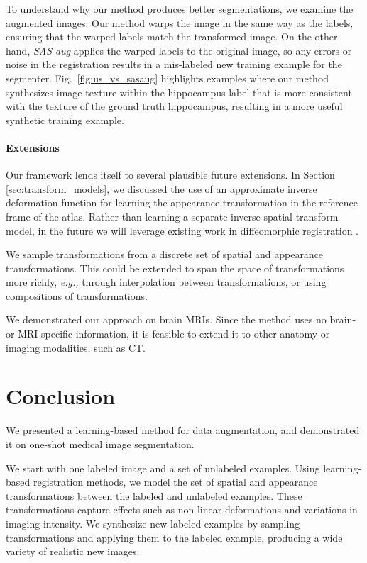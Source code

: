 \documentclass[10pt,twocolumn,letterpaper]{article}
\begin{document}
To understand why our method produces better segmentations, we examine the augmented images. Our method warps the image in the same way as the labels, ensuring that the warped labels match the transformed image. On the other hand, \textit{SAS-aug} applies the warped labels to the original image, so any errors or noise in the registration results in a mis-labeled new training example for the segmenter. Fig.~\ref{fig:us_vs_sasaug} highlights examples where our method synthesizes image texture within the hippocampus label that is more consistent with the texture of the ground truth hippocampus, resulting in a more useful synthetic training example.\vspace{-8pt}

\paragraph{Extensions} 
Our framework lends itself to several plausible future extensions. In Section \ref{sec:transform_models}, we discussed the use of an approximate inverse deformation function for learning the appearance transformation in the reference frame of the atlas. Rather than learning a separate inverse spatial transform model, in the future we will leverage existing work in diffeomorphic registration \cite{ashburner2007fast,avants2008symmetric,beg2005computing,dalca2018unsupervised,zhang2017frequency}.

We sample transformations from a discrete set of spatial and appearance transformations. This could be extended to span the space of transformations more richly, \textit{e.g.,} through interpolation between transformations, or using compositions of transformations. 

We demonstrated our approach on brain MRIs. Since the method uses no brain- or MRI-specific information, it is feasible to extend it to other anatomy or imaging modalities, such as CT. 
 \section{Conclusion}

We presented a learning-based method for data augmentation, and demonstrated it on one-shot medical image segmentation. 

We start with one labeled image and a set of unlabeled examples. Using learning-based registration methods, we model the set of spatial and appearance transformations between the labeled and unlabeled examples. These transformations capture effects such as non-linear deformations and variations in imaging intensity. We synthesize new labeled examples by sampling transformations and applying them to the labeled example, producing a wide variety of realistic new images.
\end{document}
